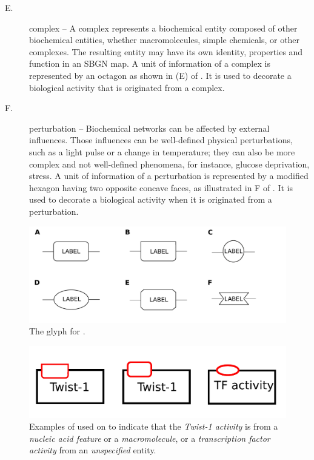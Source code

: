 \begin{glyphDescription}
\begin{description}
\item[E.] complex -- A complex represents a biochemical entity composed of other biochemical entities, whether macromolecules, simple chemicals, or other complexes. The resulting entity may 
have its own identity, properties and function in an SBGN map. A unit of information of a complex is represented by an octagon as shown in (E) of .  It is used to decorate a biological activity that is originated from a complex.

\item[F.] perturbation -- Biochemical networks can be affected by external influences. Those influences can be well-defined physical perturbations, such as a light pulse or a change in temperature; they can also be more complex and not well-defined phenomena, for instance, glucose deprivation, stress.  A unit of information of a perturbation is represented by a modified hexagon
having two opposite concave faces, as illustrated in F of  .  It is used to decorate a biological activity when it is originated from a perturbation.
\end{description}

\begin{figure}[H]
  \centering
  \includegraphics[scale = 0.2]{images/unitInformation_ba}
  \caption{The \AF glyph for .}
  \label{fig:af:unitInfo}
\end{figure}

\begin{figure}[H]
  \centering
  \includegraphics[scale = 0.5]{examples/unitofinformation}
  \caption{Examples of  used on  to indicate that the \emph{Twist-1 activity} is from a \emph{nucleic acid feature} or a \emph{macromolecule}, or a \emph{transcription factor activity} from an \emph{unspecified} entity.}
  \label{fig:af:unitofinfo}
\end{figure}


\end{glyphDescription}
